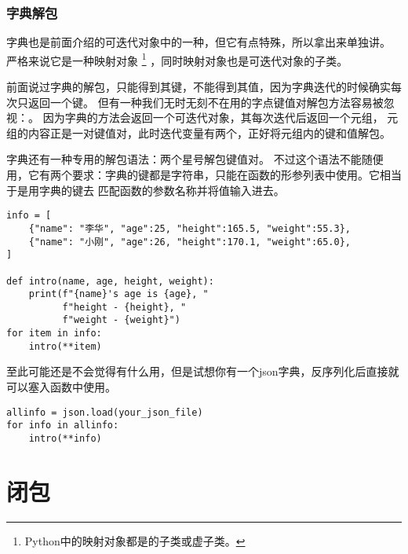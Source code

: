 \documentclass{ctexbook}
\begin{document}
\subsubsection{字典解包}
字典也是前面介绍的可迭代对象中的一种，但它有点特殊，所以拿出来单独讲。
严格来说它是一种映射对象
\footnote{Python中的映射对象都是的子类或虚子类。}
，同时映射对象也是可迭代对象的子类。

前面说过字典的解包，只能得到其键，不能得到其值，因为字典迭代的时候确实每次只返回一个键。
但有一种我们无时无刻不在用的字点键值对解包方法容易被忽视：。
因为字典的方法会返回一个可迭代对象，其每次迭代后返回一个元组，
元组的内容正是一对键值对，此时迭代变量有两个，正好将元组内的键和值解包。

字典还有一种专用的解包语法：两个星号解包键值对。
不过这个语法不能随便用，它有两个要求：字典的键都是字符串，只能在函数的形参列表中使用。它相当于是用字典的键去
匹配函数的参数名称并将值输入进去。


\begin{verbatim}
info = [
    {"name": "李华", "age":25, "height":165.5, "weight":55.3},
    {"name": "小刚", "age":26, "height":170.1, "weight":65.0},
]

def intro(name, age, height, weight):
    print(f"{name}'s age is {age}, "
          f"height - {height}, "
          f"weight - {weight}")
for item in info:
    intro(**item)
\end{verbatim}

至此可能还是不会觉得有什么用，但是试想你有一个json字典，反序列化后直接就可以塞入函数中使用。

\begin{verbatim}
allinfo = json.load(your_json_file)
for info in allinfo:
    intro(**info)
\end{verbatim}

\section{闭包}
\end{document}

